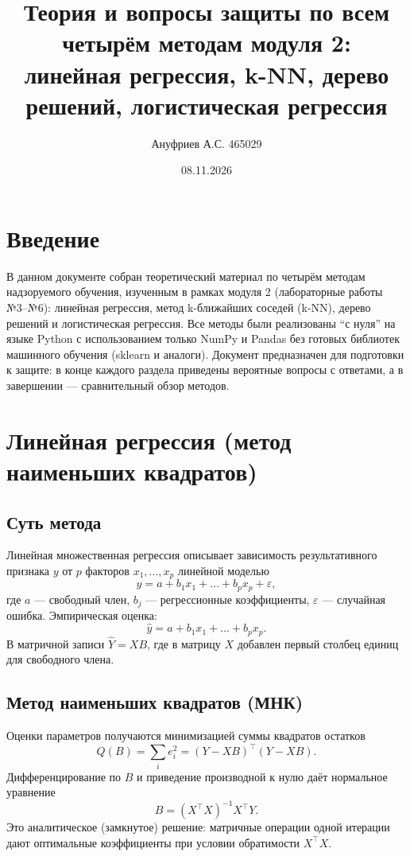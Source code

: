 \documentclass[12pt,a4paper]{article}
\title{Теория и вопросы защиты по всем четырём методам модуля 2:\\линейная регрессия, k-NN, дерево решений, логистическая регрессия}
\author{Ануфриев А.С. 465029}
\date{08.11.2026}
\begin{document}
\maketitle

\section{Введение}
В данном документе собран теоретический материал по четырём методам надзоруемого обучения, изученным в рамках модуля 2 (лабораторные работы №3--№6): линейная регрессия, метод k-ближайших соседей (k-NN), дерево решений и логистическая регрессия. Все методы были реализованы ``с нуля'' на языке Python с использованием только NumPy и Pandas без готовых библиотек машинного обучения (sklearn и аналоги). Документ предназначен для подготовки к защите: в конце каждого раздела приведены вероятные вопросы с ответами, а в завершении --- сравнительный обзор методов.

\section{Линейная регрессия (метод наименьших квадратов)}

\subsection{Суть метода}
Линейная множественная регрессия описывает зависимость результативного признака $y$ от $p$ факторов $x_1,\dots,x_p$ линейной моделью
\begin{equation}
y = a + b_1 x_1 + \dots + b_p x_p + \varepsilon ,
\end{equation}
где $a$ --- свободный член, $b_j$ --- регрессионные коэффициенты, $\varepsilon$ --- случайная ошибка. Эмпирическая оценка:
\begin{equation}
\hat{y} = a + b_1 x_1 + \dots + b_p x_p .
\end{equation}
В матричной записи $\hat{Y} = X B$, где в матрицу $X$ добавлен первый столбец единиц для свободного члена.

\subsection{Метод наименьших квадратов (МНК)}
Оценки параметров получаются минимизацией суммы квадратов остатков
\begin{equation}
Q(B) = \sum_i e_i^2 = (Y - XB)^\top (Y - XB).
\end{equation}
Дифференцирование по $B$ и приведение производной к нулю даёт нормальное уравнение
\begin{equation}
B = (X^\top X)^{-1} X^\top Y .
\end{equation}
Это аналитическое (замкнутое) решение: матричные операции одной итерации дают оптимальные коэффициенты при условии обратимости $X^\top X$.
\end{document}
